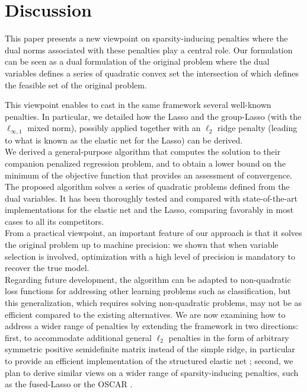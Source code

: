 \section{Discussion}


This paper presents a new viewpoint on sparsity-inducing penalties
where the dual norms associated with these penalties play a central role. 
Our formulation can be seen as a dual formulation of the original problem
where the dual variables defines a series of quadratic convex set the
intersection of which defines the feasible set of the original
problem.

This  viewpoint  enables  to  cast   in  the  same  framework  several
well-known penalties. In particular, we detailed how the Lasso and the
group-Lasso (with the $\ell_{\infty,1}$  mixed norm), possibly applied
together with an  $\ell_2$ ridge penalty (leading to what  is known as
the elastic net for the Lasso) can be derived. 
\\

We derived a  general-purpose algorithm that computes  the solution to
their companion  penalized regression problem,  and to obtain  a lower
bound  on the  minimum  of  the objective  function  that provides  an
assessment of convergence.  The proposed  algorithm solves a series of
quadratic  problems defined  from  the dual  variables.   It has  been
thoroughly tested  and compared with  state-of-the-art implementations
for the elastic  net and the Lasso, comparing favorably  in most cases
to all its competitors.%
\\

From a  practical viewpoint, an  important feature of our  approach is
that it solves the original problem  up to machine precision: we shown
that when  variable selection  is involved,  optimization with  a high
level of precision is mandatory to recover the true model.
\\

Regarding  future  development,  the   algorithm  can  be  adapted  to
non-quadratic loss  functions for  addressing other  learning problems
such  as  classification,  but  this  generalization,  which  requires
solving non-quadratic  problems, may not  be as efficient  compared to
the  existing alternatives.   We are  now examining  how to  address a
wider range of penalties by extending the framework in two directions:
first,  to accommodate  additional general  $\ell_2$ penalties  in the
form of  arbitrary symmetric  positive semidefinite matrix  instead of
the simple ridge, in particular to provide an efficient implementation
of the  structured elastic  net \citep{2010_AOS_Slawski} ;  second, we
plan to  derive similar  views on a  wider range  of sparsity-inducing
penalties, such as the fused-Lasso or the OSCAR \citep{Bondell08}.
